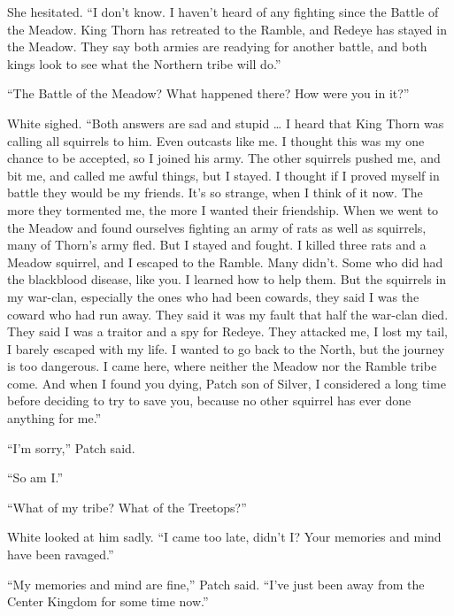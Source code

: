 \documentclass[ebook,oneside,openany,17pt]{memoir}
\newenvironment{tolerant}[1]{%
  \par\tolerance=#1\relax
}{%
  \par
}
\begin{document}
\begin{tolerant}{500}
She hesitated. “I don’t know. I haven’t heard of any fighting since
the Battle of the Meadow. King Thorn has retreated to the Ramble, and
Redeye has stayed in the Meadow. They say both armies are readying for
another battle, and both kings look to see what the Northern tribe
will do.”
\end{tolerant}

\begin{tolerant}{2000}
“The Battle of the Meadow? What happened there? How were you in it?”
\end{tolerant}

\begin{tolerant}{2000}
White sighed. “Both answers are sad and stupid\nolinebreak{} … I heard
that King Thorn was calling all squirrels to him. Even outcasts like
me. I thought this was my one chance to be accepted, so I joined his
army. The other squirrels pushed me, and bit me, and called me awful
things, but I stayed. I thought if I proved myself in battle they
would be my friends. It’s so strange, when I think of it now. The more
they tormented me, the more I wanted their friendship. When we went to
the Meadow and found ourselves fighting an army of rats as well as
squirrels, many of Thorn’s army fled. But I stayed and fought. I
killed three rats and a Meadow squirrel, and I escaped to the
Ramble. Many didn’t. Some who did had the blackblood disease, like
you. I learned how to help them. But the squirrels in my war-clan,
especially the ones who had been cowards, they said I was the coward
who had run away. They said it was my fault that half the war-clan
died. They said I was a traitor and a spy for Redeye. They attacked
me, I lost my tail, I barely escaped with my life. I wanted to go back
to the North, but the journey is too dangerous. I came here, where
neither the Meadow nor the Ramble tribe come. And when I found you
dying, Patch son of Silver, I considered a long time before deciding
to try to save you, because no other squirrel has ever done anything
for me.”
\end{tolerant}

“I’m sorry,” Patch said.

“So am I.”

“What of my tribe? What of the Treetops?”

White looked at him sadly. “I came too late, didn’t I? Your memories
and mind have been ravaged.”

“My memories and mind are fine,” Patch said. “I’ve just been away from
the Center Kingdom for some time now.”
\end{document}
